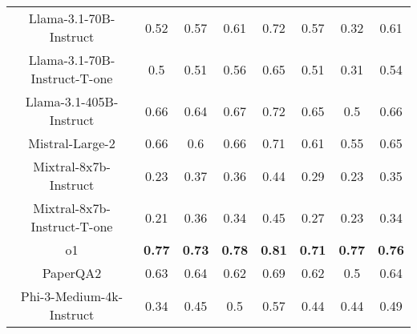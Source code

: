 \begin{tabular}{cccccccc}
Llama-3.1-70B-Instruct & 0.52 & 0.57 & 0.61 & 0.72 & 0.57 & 0.32 & 0.61 \\
Llama-3.1-70B-Instruct-T-one & 0.5 & 0.51 & 0.56 & 0.65 & 0.51 & 0.31 & 0.54 \\
Llama-3.1-405B-Instruct & 0.66 & 0.64 & 0.67 & 0.72 & 0.65 & 0.5 & 0.66 \\
Mistral-Large-2 & 0.66 & 0.6 & 0.66 & 0.71 & 0.61 & 0.55 & 0.65 \\
Mixtral-8x7b-Instruct & 0.23 & 0.37 & 0.36 & 0.44 & 0.29 & 0.23 & 0.35 \\
Mixtral-8x7b-Instruct-T-one & 0.21 & 0.36 & 0.34 & 0.45 & 0.27 & 0.23 & 0.34 \\
o1 & \textbf{0.77} & \textbf{0.73} & \textbf{0.78} & \textbf{0.81} & \textbf{0.71} & \textbf{0.77} & \textbf{0.76} \\
PaperQA2 & 0.63 & 0.64 & 0.62 & 0.69 & 0.62 & 0.5 & 0.64 \\
Phi-3-Medium-4k-Instruct & 0.34 & 0.45 & 0.5 & 0.57 & 0.44 & 0.44 & 0.49 \\
\bottomrule
\end{tabular}
